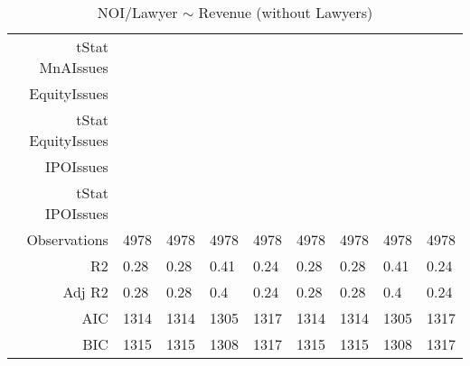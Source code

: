 \begin{table}[ht]
\begin{tabular}{rllllllll}
  tStat MnAIssues &  &  &  &  &  &  &  &  \\ 
  EquityIssues &  &  &  &  &  &  &  &  \\ 
  tStat EquityIssues &  &  &  &  &  &  &  &  \\ 
  IPOIssues &  &  &  &  &  &  &  &  \\ 
  tStat IPOIssues &  &  &  &  &  &  &  &  \\ 
  Observations & 4978 & 4978 & 4978 & 4978 & 4978 & 4978 & 4978 & 4978 \\ 
  R2 & 0.28 & 0.28 & 0.41 & 0.24 & 0.28 & 0.28 & 0.41 & 0.24 \\ 
  Adj R2 & 0.28 & 0.28 & 0.4 & 0.24 & 0.28 & 0.28 & 0.4 & 0.24 \\ 
  AIC & 1314 & 1314 & 1305 & 1317 & 1314 & 1314 & 1305 & 1317 \\ 
  BIC & 1315 & 1315 & 1308 & 1317 & 1315 & 1315 & 1308 & 1317 \\ 
   \hline
\end{tabular}
\caption{NOI/Lawyer $\sim$ Revenue (without Lawyers)} 
\end{table}
